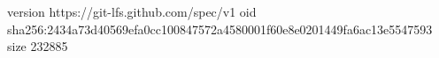 version https://git-lfs.github.com/spec/v1
oid sha256:2434a73d40569efa0cc100847572a4580001f60e8e0201449fa6ac13e5547593
size 232885
